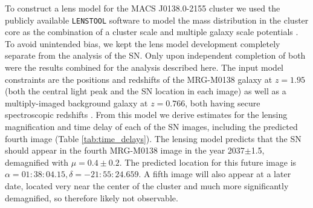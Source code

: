 \documentclass[12pt,dvipsnames]{article}
\def\lenstool{{\tt LENSTOOL}\xspace}
\begin{document}
To construct a lens model for the MACS J0138.0-2155 cluster we used the publicly available \lenstool software \cite{jullo_bayesian_2007, kneib_lenstool_2011} to model the mass distribution in the cluster core as the combination of a cluster scale and multiple galaxy scale potentials \cite{materials_methods_2020}.  To avoid unintended bias, we kept the lens model development completely separate from the analysis of the SN.  Only upon independent completion of both were the results combined for the analysis described here.  The input model constraints are the positions and redshifts of the MRG-M0138 galaxy at $z=1.95$ (both the central light peak and the SN location in each image) as well as a multiply-imaged background 
galaxy at $z=0.766$, both having secure spectroscopic redshifts \cite{materials_methods_2020}.  
From this model we derive estimates for the lensing magnification and time delay of each of the SN images, including the predicted fourth image (Table \ref{tab:time_delays}).
The lensing model predicts that the SN should appear in the fourth MRG-M0138 image in the year 2037$\pm$1.5, demagnified with $\mu=0.4\pm0.2$. The predicted location for this future image is $\alpha=01:38:04.15,\delta=-21:55:24.659$.
A fifth image will also appear at a later date, located very near the center of the cluster and much more significantly demagnified, so therefore likely not observable.  
 
\end{document}
